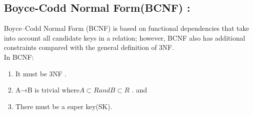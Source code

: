 \subsection{Boyce-Codd Normal Form(BCNF) : }
Boyce–Codd Normal Form (BCNF) is based on functional dependencies that take into account all candidate keys in a relation; however, BCNF also has additional constraints compared with the general definition of 3NF.\\
In BCNF:
\begin{enumerate}
\item It must be 3NF .
\item A→B is trivial where$ A \subset R and B \subset R $ . and
\item There must be a super key(SK).
  
\end{enumerate}
